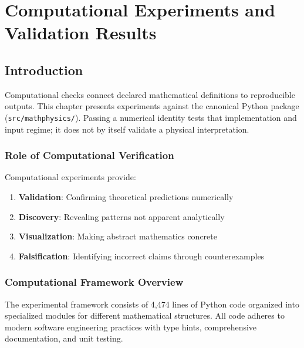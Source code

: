 
\chapter{Computational Experiments and Validation Results}
\label{ch:experiments}

\section{Introduction}

Computational checks connect declared mathematical definitions to reproducible outputs. This chapter presents experiments against the canonical Python package (\texttt{src/mathphysics/}). Passing a numerical identity tests that implementation and input regime; it does not by itself validate a physical interpretation.

\subsection{Role of Computational Verification}

Computational experiments provide:
\begin{enumerate}
    \item \textbf{Validation}: Confirming theoretical predictions numerically
    \item \textbf{Discovery}: Revealing patterns not apparent analytically
    \item \textbf{Visualization}: Making abstract mathematics concrete
    \item \textbf{Falsification}: Identifying incorrect claims through counterexamples
\end{enumerate}

\subsection{Computational Framework Overview}

The experimental framework consists of 4,474 lines of Python code organized into specialized modules for different mathematical structures. All code adheres to modern software engineering practices with type hints, comprehensive documentation, and unit testing.


